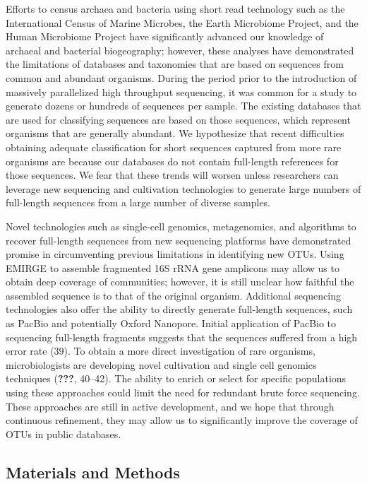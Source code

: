 \documentclass[11pt,]{article}
\begin{document}
Efforts to census archaea and bacteria using short read technology such
as the International Census of Marine Microbes, the Earth Microbiome
Project, and the Human Microbiome Project have significantly advanced
our knowledge of archaeal and bacterial biogeography; however, these
analyses have demonstrated the limitations of databases and taxonomies
that are based on sequences from common and abundant organisms. During
the period prior to the introduction of massively parallelized high
throughput sequencing, it was common for a study to generate dozens or
hundreds of sequences per sample. The existing databases that are used
for classifying sequences are based on those sequences, which represent
organisms that are generally abundant. We hypothesize that recent
difficulties obtaining adequate classification for short sequences
captured from more rare organisms are because our databases do not
contain full-length references for those sequences. We fear that these
trends will worsen unless researchers can leverage new sequencing and
cultivation technologies to generate large numbers of full-length
sequences from a large number of diverse samples.

Novel technologies such as single-cell genomics, metagenomics, and
algorithms to recover full-length sequences from new sequencing
platforms have demonstrated promise in circumventing previous
limitations in identifying new OTUs. Using EMIRGE to assemble fragmented
16S rRNA gene amplicons may allow us to obtain deep coverage of
communities; however, it is still unclear how faithful the assembled
sequence is to that of the original organism. Additional sequencing
technologies also offer the ability to directly generate full-length
sequences, such as PacBio and potentially Oxford Nanopore. Initial
application of PacBio to sequencing full-length fragments suggests that
the sequences suffered from a high error rate (39). To obtain a more
direct investigation of rare organisms, microbiologists are developing
novel cultivation and single cell genomics techniques ({\textbf{???}},
40--42). The ability to enrich or select for specific populations using
these approaches could limit the need for redundant brute force
sequencing. These approaches are still in active development, and we
hope that through continuous refinement, they may allow us to
significantly improve the coverage of OTUs in public databases.

\subsection{Materials and Methods}\label{materials-and-methods}
\end{document}
